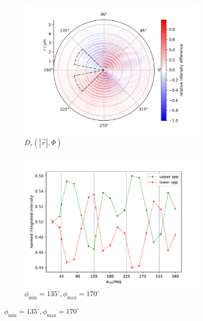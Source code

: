 \documentclass[titlepage,  ngerman]{article}
\begin{document}
		\begin{figure}		
			\begin{subfigure}[b]{0.5\textwidth}
				\centering
				\includegraphics[width=\textwidth]{figures/fp/fp_back.png}
				\caption{	$D_r\left(|\vec{r}|, \Phi\right)$}
				\label{fig:diff_fp_45_135}
			\end{subfigure}
			\hfill
			\begin{subfigure}[b]{0.49\textwidth}
				\centering
				\includegraphics[width=\textwidth]{figures/fp/fp_back_int.pdf}
				\caption{$\phi_\mathrm{min} =135^\circ, \phi_\mathrm{max}=170^\circ$}
				\label{fig:int_fp_45_135}
			\end{subfigure}
			

\end{figure}
\end{document}
